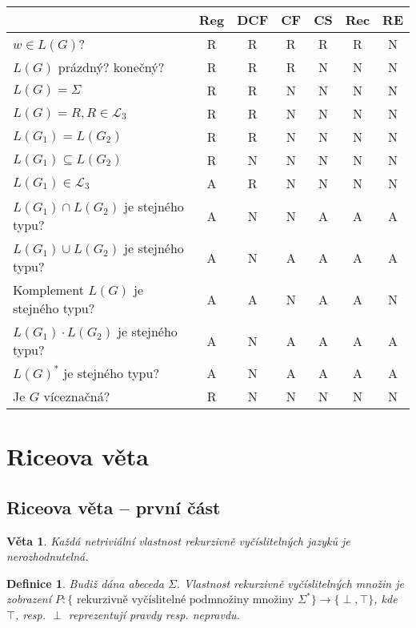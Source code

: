\documentclass[a4paper, 11pt]{report}
\newtheorem{mydef}{Definice}[chapter]
\newtheorem{veta}{Věta}[chapter]
\begin{document}
\begin{tabular}{l |c|c|c|c|c|c|}
											&Reg&DCF& CF& CS&Rec&RE \\ \hline
	$w \in L(G)$?							& R & R & R & R & R & N \\ \hline
	$L(G)$ prázdný? konečný?				& R & R & R & N & N & N \\ \hline
	$L(G) = \Sigma$							& R & R & N & N & N & N \\ \hline
	$L(G) = R, R \in \mathcal{L}_3$			& R & R & N & N & N & N \\ \hline
	$L(G_1) = L(G_2)$						& R & R & N & N & N & N \\ \hline
	$L(G_1) \subseteq L(G_2)$				& R & N & N & N & N & N \\ \hline
	$L(G_1) \in \mathcal{L}_3$				& A & R & N & N & N & N \\ \hline
	$L(G_1) \cap L(G_2)$ je stejného typu?	& A & N & N & A & A & A \\ \hline
	$L(G_1) \cup L(G_2)$ je stejného typu?	& A & N & A & A & A & A \\ \hline
	Komplement $L(G)$ je stejného typu?		& A & A & N & A & A & N \\ \hline
	$L(G_1) \cdot L(G_2)$ je stejného typu?	& A & N & A & A & A & A \\ \hline
	$L(G)^*$ je stejného typu?				& A & N & A & A & A & A \\ \hline
	Je $G$ víceznačná?						& R & N & N & N & N & N \\ \hline
\end{tabular}

\section{Riceova věta}
\subsection{Riceova věta -- první část}
\begin{veta}
Každá netriviální vlastnost rekurzivně vyčíslitelných jazyků je nerozhodnutelná.
\end{veta}

\begin{mydef}
Budiž dána abeceda $\Sigma$. Vlastnost rekurzivně vyčíslitelných množin je zobrazení $P : \{ \text{ rekurzivně vyčíslitelné podmnožiny množiny } \Sigma^* \} \to \{\perp, \top\}$, kde $\top$, resp. $\perp$ reprezentují pravdy resp. nepravdu.
\end{mydef}
\end{document}
